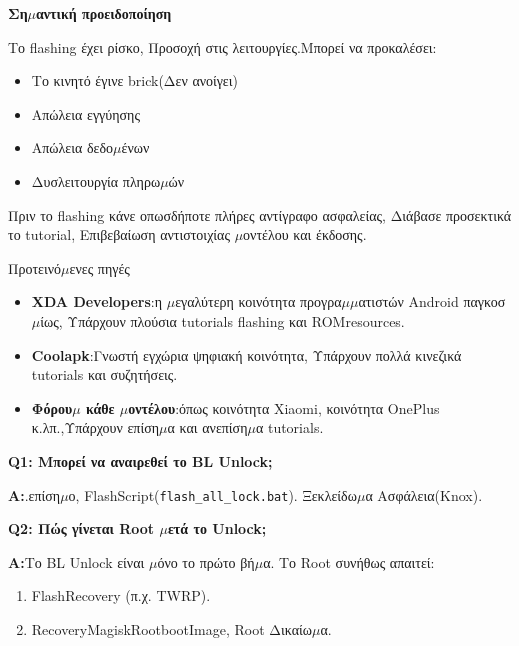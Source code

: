 \textbf{Ση$\mu$αντική προειδοποίηση}\par

Το flashing έχει ρίσκο, Προσοχή στις λειτουργίες.Μπορεί να προκαλέσει:

\begin{itemize}
  \item Το κινητό έγινε brick(Δεν ανοίγει)
  \item Απώλεια εγγύησης
  \item Απώλεια δεδο$\mu$ένων
  \item Δυσλειτουργία πληρω$\mu$ών
\end{itemize}

Πριν το flashing κάνε οπωσδήποτε πλήρες αντίγραφο ασφαλείας, Διάβασε προσεκτικά το tutorial, Επιβεβαίωση αντιστοιχίας $\mu$οντέλου και έκδοσης.

\begin{tcbinfo}{Προτεινό$\mu$ενες πηγές}
\begin{itemize}
  \item \textbf{XDA Developers}:η $\mu$εγαλύτερη κοινότητα προγρα$\mu$$\mu$ατιστών Android παγκοσ$\mu$ίως, Υπάρχουν πλούσια tutorials flashing και ROMresources.
  \item \textbf{Coolapk}:Γνωστή εγχώρια ψηφιακή κοινότητα, Υπάρχουν πολλά κινεζικά tutorials και συζητήσεις.
  \item \textbf{Φόρου$\mu$ κάθε $\mu$οντέλου}:όπως κοινότητα Xiaomi, κοινότητα OnePlus κ.λπ.,Υπάρχουν επίση$\mu$α και ανεπίση$\mu$α tutorials.
\end{itemize}

\end{tcbinfo}


\textbf{Q1: Μπορεί να αναιρεθεί το BL Unlock;}\par

\textbf{A:}.επίση$\mu$ο, FlashScript(\texttt{flash\_all\_lock.\allowbreak bat}). Ξεκλείδω$\mu$α Ασφάλεια(Knox).

\textbf{Q2: Πώς γίνεται Root $\mu$ετά το Unlock;}\par

\textbf{A:}Το BL Unlock είναι $\mu$όνο το πρώτο βή$\mu$α. Το Root συνήθως απαιτεί:

\begin{enumerate}
  \item FlashRecovery (π.χ. TWRP).
  \item RecoveryMagiskRootbootImage, Root Δικαίω$\mu$α.
\end{enumerate}
